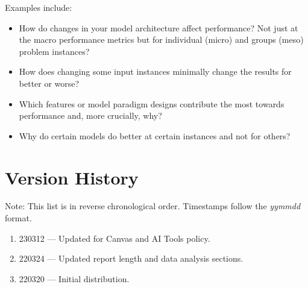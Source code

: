 \documentclass[11pt]{article}
\begin{document}
\begin{enumerate}
    Examples include:
    \begin{itemize}
        \item How do changes in your model architecture affect performance?  Not just at the macro performance metrics but for individual (micro) and groups (meso) problem instances?
        \item How does changing some input instances minimally change the results for better or worse?
        \item Which features or model paradigm designs contribute the most towards performance and, more crucially, why?
        \item Why do certain models do better at certain instances and not for others?
    \end{itemize}
    
\end{enumerate}

\section{Version History}

Note: This list is in reverse chronological order.  Timestamps follow the {\it yymmdd} format.
\begin{enumerate}
    \item 230312 --- Updated for Canvas and AI Tools policy.
    \item 220324 --- Updated report length and data analysis sections.
    \item 220320 --- Initial distribution.
\end{enumerate}
\end{document}
